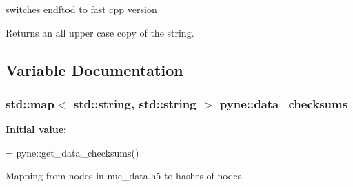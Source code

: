 switches endftod to fast cpp version 

Returns an all upper case copy of the string. 

\subsection{Variable Documentation}
\hypertarget{namespacepyne_a092bde815498a51a7532e3021a63ede5}{
\subsubsection[{data\+\_\+checksums}]{\setlength{\rightskip}{0pt plus 5cm}std\+::map$<$ std\+::string, std\+::string $>$ pyne\+::data\+\_\+checksums}}\label{namespacepyne_a092bde815498a51a7532e3021a63ede5}
{\bfseries Initial value\+:}
\begin{DoxyCode}
=
  pyne::get\_data\_checksums()
\end{DoxyCode}


Mapping from nodes in nuc\+\_\+data.\+h5 to hashes of nodes. 

